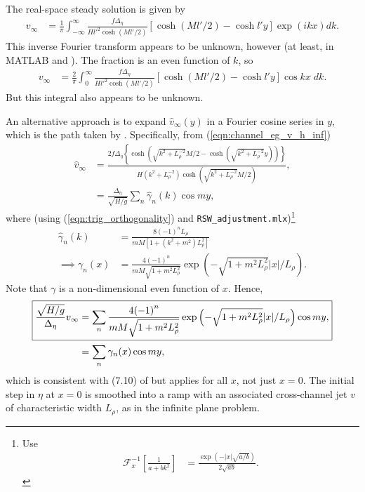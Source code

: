 \documentclass[10pt,reqno]{amsart}
\begin{document}
The real-space steady solution is given by
\begin{align}
v_{\infty} & = 
\frac{1}{ \pi }
\int_{-\infty}^{\infty}
\frac{f \Delta_\eta }{H l'^2 \cosh\left( M l' / 2 \right)}
 \left[ \cosh \left( M l' / 2 \right) - \cosh l' y \right] 
\exp \left( i k x \right)  dk.  
\end{align}
This inverse Fourier transform appears to be unknown, however (at least, in MATLAB and \citealt{gradshteyn&ryzhik00}).
The fraction is an even function of $k$, so
\begin{align}
v_{\infty} & = 
\frac{2}{ \pi }
\int_{0}^{\infty}
\frac{f \Delta_\eta }{H l'^2 \cosh\left( M l' / 2 \right)} \left[\cosh \left( M l' / 2 \right) - \cosh l' y \right] \cos k x \;  dk.  
\end{align}
But this integral also appears to be unknown.

An alternative approach is to expand $\hat{v}_\infty (y)$ in a Fourier cosine series in $y$, which is the path taken by \citet{gill76}.
Specifically, from (\ref{eqn:channel_eg_v_h_inf})
\begin{align}
\hat{v}_{\infty} & = \frac{2 f \Delta_\eta  \left\{ \cosh \left( \sqrt{ k^2 + L_\rho^{-2} }M/2 - \cosh \left( \sqrt{k^2 + L_\rho^{-2}} y \right) \right) \right\} }{ H \left( k^2 + L_\rho^{-2}\right) \cosh\left( \sqrt{ k^2 + L_\rho^{-2}} M / 2 \right) } , \\
& =  \frac{\Delta_\eta}{\sqrt{H/g}} \sum_n \hat{\gamma}_n (k) \cos m y ,
\label{eqn:channel_eg_v_hat_inf}
\end{align}
where (using (\ref{eqn:trig_orthogonality}) and \texttt{RSW\_adjustment.mlx})\footnote{
Use
\begin{align}
{\mathcal F}^{-1}_x \left[ \frac{1}{a + b k^2} \right] &= \frac{\exp \left( - |x| \sqrt{a/b} \right)}{2 \sqrt{a b}} .
\label{eqn:FT1}
\end{align}
}
\begin{align}
\hat{\gamma}_n (k) & = \frac{8 {\left(-1\right)}^{n} L_\rho}{m M \left[1 + \left( k^2 + m^2\right) L_\rho^2 \right]}  \label{eqn:gamma_hat_n}\\
\implies \gamma_n (x) & = \frac{4 {\left(-1\right)}^{n} }{m M  \sqrt{ 1 + m^2 L_\rho^2 }} \exp \left( - \sqrt{1 + m^2 L_\rho^2 } |x|/L_\rho \right) .
\end{align}
Note that $\gamma$ is a non-dimensional even function of $x$.
Hence, 
\begin{align}
\Aboxed{
\frac{\sqrt{H/g}}{\Delta_\eta} v_{\infty} 
& = \sum_n \frac{4 {\left(-1\right)}^{n} }{m M \sqrt{ 1+  m^2 L_\rho^2 }} \exp \left( -\sqrt{1 + m^2 L_\rho^2 }  |x| / L_\rho \right) \cos m y ,}
\label{eqn:channel_eg_v_infty_soln} \\
& = \sum_n \gamma_n (x) \cos m y , 
\label{eqn:channel_eg_v_infty_soln_expansion}
\end{align}
which is consistent with (7.10) of \citet{gill76} but applies for all $x$, not just $x=0$.
The initial step in $\eta$ at $x=0$ is smoothed into a ramp with an associated cross-channel jet $v$ of characteristic width $L_\rho$, as in the infinite plane problem.
\end{document}
